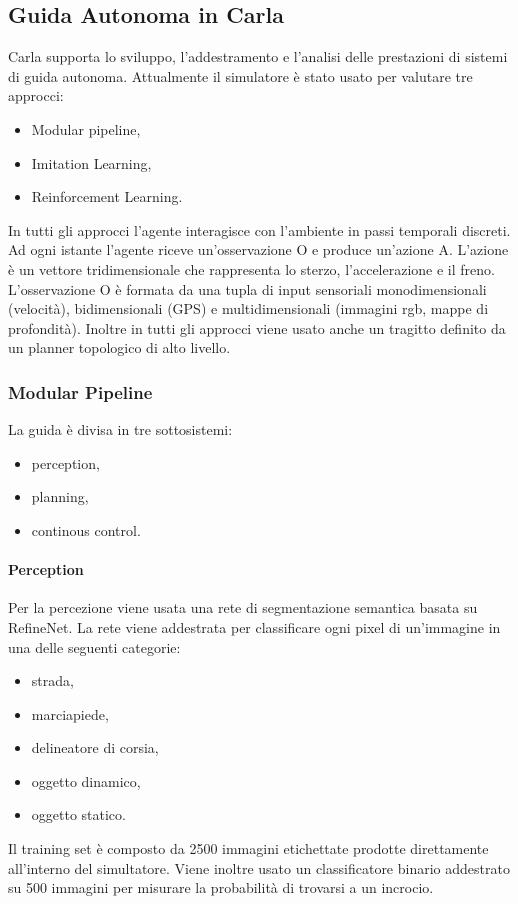 \subsection{Guida Autonoma in Carla}
Carla supporta lo sviluppo, l'addestramento e l'analisi delle prestazioni di sistemi di guida autonoma.
Attualmente il simulatore è stato usato per valutare tre approcci:
\begin{itemize}
    \item Modular pipeline,
    \item Imitation Learning,
    \item Reinforcement Learning.
\end{itemize}
In tutti gli approcci l'agente interagisce con l'ambiente in passi temporali discreti. Ad ogni istante  l'agente riceve un'osservazione O e produce un'azione 
A. L'azione è un vettore tridimensionale che rappresenta lo sterzo, l'accelerazione e il freno. L'osservazione O è formata da una tupla di input
sensoriali monodimensionali (velocità), bidimensionali (GPS) e multidimensionali (immagini rgb, mappe di profondità). Inoltre in tutti gli approcci viene usato
anche un tragitto definito da un planner topologico di alto livello.

\subsubsection{Modular Pipeline}
La guida è divisa in tre sottosistemi:
\begin{itemize}
    \item perception,
    \item planning,
    \item continous control.
\end{itemize}

\paragraph{Perception} Per la percezione viene usata una rete di segmentazione semantica basata su RefineNet. La rete viene addestrata per classificare ogni
pixel di un'immagine in una delle seguenti categorie:
\begin{itemize}
    \item strada,
    \item marciapiede,
    \item delineatore di corsia,
    \item oggetto dinamico,
    \item oggetto statico.
\end{itemize}
Il training set è composto da 2500 immagini etichettate prodotte direttamente all'interno del simultatore.
Viene inoltre usato un classificatore binario addestrato su 500 immagini per misurare la probabilità di trovarsi a un incrocio.
